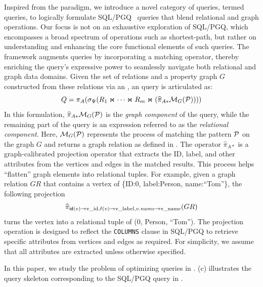 Inspired from the \spj paradigm, we introduce a novel category of queries, termed \spjm queries, to logically formulate SQL/PGQ~\cite{sql-pgq} queries that
blend relational and graph operations. Our focus is not on an exhaustive exploration of SQL/PGQ, which encompasses a broad spectrum of operations such as shortest-path, but rather on understanding and enhancing the core functional elements of such queries.
The \spjm framework augments \spj queries by incorporating a matching operator, thereby enriching the query's expressive power to seamlessly navigate both relational and graph data domains.
Given the set of relations and a property graph \(G\) constructed from these relations via an \rgmapping, %
an \spjm query is articulated as:
\begin{equation}
    \label{eq:spjm}
Q = \pi_A(\sigma_\Psi(R_1 \Join \cdots \Join R_m \Join (\widehat{\pi}_{A*}\mathcal{M}_G(\mathcal{P}))))
\end{equation}
In this formulation, \(\widehat{\pi}_{A*}\mathcal{M}_G(\mathcal{P})\) is the \emph{graph component} of
the query, while the remaining part of the query is an \spj expression referred to as the \emph{relational component}.
Here, \(\mathcal{M}_G(\mathcal{P})\) represents the process of matching the pattern \(\mathcal{P}\) on the graph \(G\) and
returns a graph relation as defined in . The operator \(\widehat{\pi}_{A*}\) is a
graph-calibrated projection operator that extracts the ID, label, and other attributes from the vertices and edges in the matched results.
This process helps ``flatten'' graph elements into relational tuples.
For example, given a graph relation $GR$ that contains a vertex of \{ID:0, label:Person, name:``Tom''\}, the
following projection
\[
\widehat{\pi}_{{\mathsf{id}}(v) \rightarrow \text{v\_id}, \mathcal{\ell}(v) \rightarrow \text{v\_label}, v.name \rightarrow \text{v\_name}}(GR)
\]
turns the vertex into a relational tuple of (0, Person, ``Tom'').
The projection operation is designed to reflect the \lstinline{COLUMNS} clause in SQL/PGQ
to retrieve specific attributes from vertices and edges as required. For simplicity, we assume that all
attributes are extracted unless otherwise specified.

In this paper, we study the problem of optimizing \spjm queries in . (c) illustrates the \spjm query skeleton corresponding to the SQL/PGQ query in .


